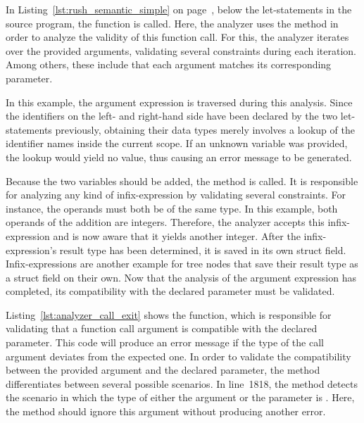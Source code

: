 In Listing~\ref{lst:rush_semantic_simple} on page~\pageref{lst:rush_semantic_simple}, below the let-statements in the source program, the  function is called.
Here, the analyzer uses the  method in order to analyze the validity of this function call.
For this, the analyzer iterates over the provided arguments, validating several constraints during each iteration.
Among others, these include that each argument matches its corresponding parameter.

In this example, the argument expression  is traversed during this analysis.
Since the identifiers on the left- and right-hand side have been declared by the two let-statements previously,
obtaining their data types merely involves a lookup of the identifier names inside the current scope.
If an unknown variable was provided, the lookup would yield no value, thus causing an error message to be generated.

Because the two variables should be added, the  method is called.
It is responsible for analyzing any kind of infix-expression by validating several constraints.
For instance, the operands must both be of the same type.
In this example, both operands of the addition are integers.
Therefore, the analyzer accepts this infix-expression and is now aware that it yields another integer.
After the infix-expression's result type has been determined, it is saved in its own  struct field.
Infix-expressions are another example for tree nodes that save their result type as a struct field on their own.
Now that the analysis of the argument expression has completed, its compatibility with the declared parameter must be validated.


Listing~\ref{lst:analyzer_call_exit} shows the  function, which is responsible for validating that a function call argument is compatible with the declared parameter.
This code will produce an error message if the type of the call argument deviates from the expected one.
In order to validate the compatibility between the provided argument and the declared parameter, the method differentiates between several possible scenarios.
In line~1818, the method detects the scenario in which the type of either the argument or the parameter is .
Here, the method should ignore this argument without producing another error.

